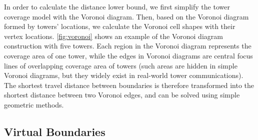 In order to calculate the distance lower bound, 
we first simplify the tower coverage model with the Voronoi diagram. 
Then, based on the Voronoi diagram formed by towers' locations, we calculate the Voronoi cell shapes with their vertex locations. 
\autoref{fig:voronoi} shows an example of the Voronoi diagram construction with five towers. 
Each region in the Voronoi diagram represents the coverage area of one tower, while the edges in Voronoi diagrams are central focus lines of overlapping coverage area of towers (such areas are hidden in simple Voronoi diagrams, but they widely exist in real-world tower communications).  
The shortest travel distance between boundaries is therefore transformed into the shortest distance between two Voronoi edges, 
and can be solved using simple geometric methods. %
%


\subsection{Virtual Boundaries}

